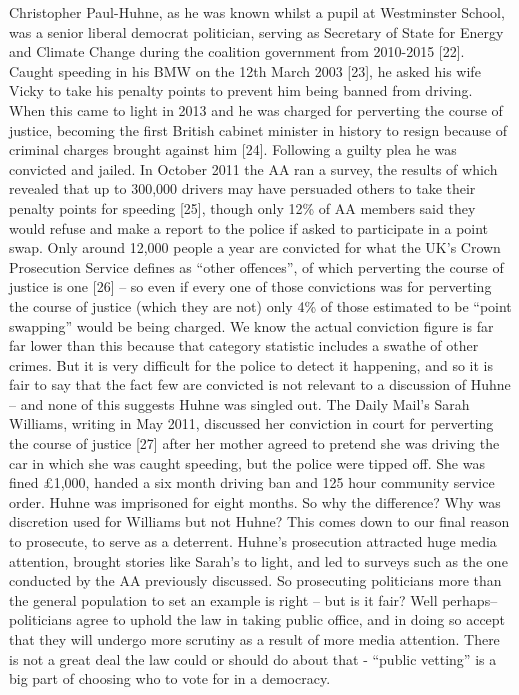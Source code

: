 Christopher Paul-Huhne, as he was known whilst a pupil at Westminster School, was a senior liberal democrat politician, serving as Secretary of State for Energy and Climate Change during the coalition government from 2010-2015 [22]. Caught speeding in his BMW on the 12th March 2003 [23], he asked his wife Vicky to take his penalty points to prevent him being banned from driving. When this came to light in 2013 and he was charged for perverting the course of justice, becoming the first British cabinet minister in history to resign because of criminal charges brought against him [24]. Following a guilty plea he was convicted and jailed. In October 2011 the AA ran a survey, the results of which revealed that up to 300,000 drivers may have persuaded others to take their penalty points for speeding [25], though only 12\% of AA members said they would refuse and make a report to the police if asked to participate in a point swap. Only around 12,000 people a year are convicted for what the UK’s Crown Prosecution Service defines as “other offences”, of which perverting the course of justice is one [26] – so even if every one of those convictions was for perverting the course of justice (which they are not) only 4\% of those estimated to be “point swapping” would be being charged. We know the actual conviction figure is far far lower than this because that category statistic includes a swathe of other crimes. But it is very difficult for the police to detect it happening, and so it is fair to say that the fact few are convicted is not relevant to a discussion of Huhne – and none of this suggests Huhne was singled out. The Daily Mail’s Sarah Williams, writing in May 2011, discussed her conviction in court for perverting the course of justice [27] after her mother agreed to pretend she was driving the car in which she was caught speeding, but the police were tipped off. She was fined £1,000, handed a six month driving ban and 125 hour community service order. Huhne was imprisoned for eight months. So why the difference? Why was discretion used for Williams but not Huhne? This comes down to our final reason to prosecute, to serve as a deterrent. Huhne’s prosecution attracted huge media attention, brought stories like Sarah’s to light, and led to surveys such as the one conducted by the AA previously discussed. So prosecuting politicians more than the general population to set an example is right – but is it fair? Well perhaps– politicians agree to uphold the law in taking public office, and in doing so accept that they will undergo more scrutiny as a result of more media attention. There is not a great deal the law could or should do about that - “public vetting” is a big part of choosing who to vote for in a democracy.

